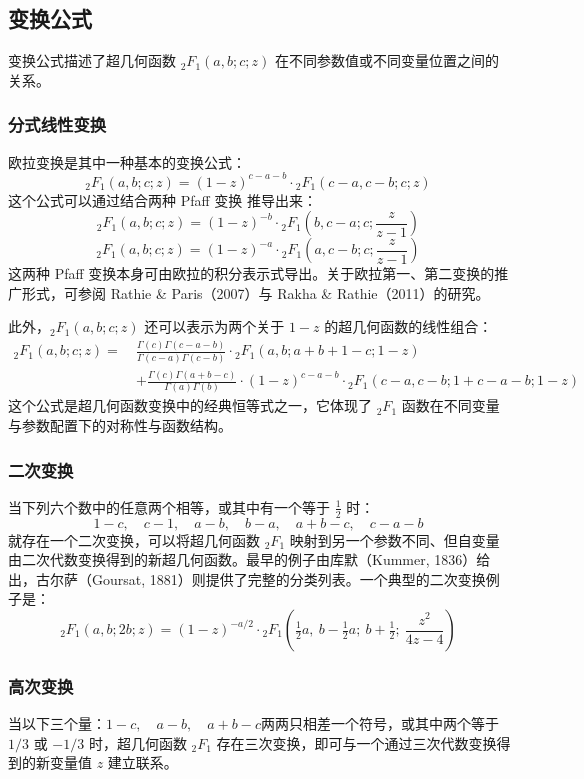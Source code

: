 \subsection{变换公式}
变换公式描述了超几何函数 ${}_2F_1(a, b; c; z)$ 在不同参数值或不同变量位置之间的关系。
\subsubsection{分式线性变换}
欧拉变换是其中一种基本的变换公式：
$$
{}_2F_1(a, b; c; z) = (1 - z)^{c - a - b} \cdot {}_2F_1(c - a, c - b; c; z)~
$$
这个公式可以通过结合两种 Pfaff 变换 推导出来：
$$
{}_2F_1(a, b; c; z) = (1 - z)^{-b} \cdot {}_2F_1\left(b, c - a; c; \frac{z}{z - 1}\right)~
$$
$$
{}_2F_1(a, b; c; z) = (1 - z)^{-a} \cdot {}_2F_1\left(a, c - b; c; \frac{z}{z - 1}\right)~
$$
这两种 Pfaff 变换本身可由欧拉的积分表示式导出。关于欧拉第一、第二变换的推广形式，可参阅 Rathie & Paris（2007）与 Rakha & Rathie（2011）的研究。

此外，${}_2F_1(a, b; c; z)$ 还可以表示为两个关于 $1 - z$ 的超几何函数的线性组合：
$$
\begin{aligned}
{}_2F_1(a, b; c; z) =\ & \frac{\Gamma(c) \Gamma(c - a - b)}{\Gamma(c - a) \Gamma(c - b)} \cdot {}_2F_1(a, b; a + b + 1 - c; 1 - z) \\
&+ \frac{\Gamma(c) \Gamma(a + b - c)}{\Gamma(a) \Gamma(b)} \cdot (1 - z)^{c - a - b} \cdot {}_2F_1(c - a, c - b; 1 + c - a - b; 1 - z)
\end{aligned}~
$$
这个公式是超几何函数变换中的经典恒等式之一，它体现了 ${}_2F_1$ 函数在不同变量与参数配置下的对称性与函数结构。
\subsubsection{二次变换}
当下列六个数中的任意两个相等，或其中有一个等于 $\tfrac{1}{2}$ 时：
$$
1 - c,\quad c - 1,\quad a - b,\quad b - a,\quad a + b - c,\quad c - a - b~
$$
就存在一个二次变换，可以将超几何函数 ${}_2F_1$ 映射到另一个参数不同、但自变量由二次代数变换得到的新超几何函数。最早的例子由库默（Kummer, 1836）给出，古尔萨（Goursat, 1881）则提供了完整的分类列表。一个典型的二次变换例子是：
$$
{}_2F_1(a, b; 2b; z) =
(1 - z)^{-a/2} \cdot {}_2F_1\left(\tfrac{1}{2}a,\ b - \tfrac{1}{2}a;\ b + \tfrac{1}{2};\ \frac{z^2}{4z - 4}\right)~
$$
\subsubsection{高次变换}
当以下三个量：$1 - c,\quad a - b,\quad a + b - c$两两只相差一个符号，或其中两个等于 $1/3$ 或 $-1/3$ 时，超几何函数 ${}_2F_1$ 存在三次变换，即可与一个通过三次代数变换得到的新变量值 $z$ 建立联系。

